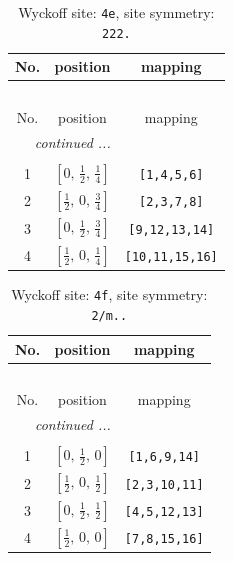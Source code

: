 \documentclass[fleqn,8pt]{jsarticle}
\begin{document}
\begin{longtable}{ccc}
\caption{Wyckoff site: {\tt 4e}, site symmetry: {\tt 222.}}
 \\
 \hline \hline
No. & position & mapping \\ \hline \endfirsthead

\multicolumn{2}{l}{\tablename\ \thetable{}} \\
 \hline \hline
No. & position & mapping \\ \hline \endhead

 \hline \hline
\multicolumn{2}{r}{\footnotesize\it continued ...} \\ \endfoot

 \hline \hline
\multicolumn{2}{r}{} \\ \endlastfoot

1 & $\left[ 0,\, \frac{1}{2},\, \frac{1}{4} \right]$ & {\tt [1,4,5,6]} \\ \hline
2 & $\left[ \frac{1}{2},\, 0,\, \frac{3}{4} \right]$ & {\tt [2,3,7,8]} \\ \hline
3 & $\left[ 0,\, \frac{1}{2},\, \frac{3}{4} \right]$ & {\tt [9,12,13,14]} \\ \hline
4 & $\left[ \frac{1}{2},\, 0,\, \frac{1}{4} \right]$ & {\tt [10,11,15,16]} \\
\end{longtable}
\renewcommand{\arraystretch}{1.2}
\begin{longtable}{ccc}
\caption{Wyckoff site: {\tt 4f}, site symmetry: {\tt 2/m..}}
 \\
 \hline \hline
No. & position & mapping \\ \hline \endfirsthead

\multicolumn{2}{l}{\tablename\ \thetable{}} \\
 \hline \hline
No. & position & mapping \\ \hline \endhead

 \hline \hline
\multicolumn{2}{r}{\footnotesize\it continued ...} \\ \endfoot

 \hline \hline
\multicolumn{2}{r}{} \\ \endlastfoot

1 & $\left[ 0,\, \frac{1}{2},\, 0 \right]$ & {\tt [1,6,9,14]} \\ \hline
2 & $\left[ \frac{1}{2},\, 0,\, \frac{1}{2} \right]$ & {\tt [2,3,10,11]} \\ \hline
3 & $\left[ 0,\, \frac{1}{2},\, \frac{1}{2} \right]$ & {\tt [4,5,12,13]} \\ \hline
4 & $\left[ \frac{1}{2},\, 0,\, 0 \right]$ & {\tt [7,8,15,16]} \\
\end{longtable}
\end{document}
